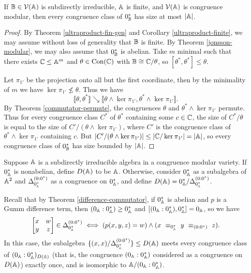 \begin{appendices}
\begin{prop}\label{monolith-bound} If $\mathbb{B} \in \mathcal{V}(\mathbb{A})$ is subdirectly irreducible, $\mathbb{A}$ is finite, and $\mathcal{V}(\mathbb{A})$ is congruence modular, then every congruence class of $0_{\mathbb{B}}^*$ has size at most $|\mathbb{A}|$.
\end{prop}
\begin{proof} By Theorem \ref{ultraproduct-fin-gen} and Corollary \ref{ultraproduct-finite}, we may assume without loss of generality that $\mathbb{B}$ is finite. By Theorem \ref{jonsson-modular}, we may also assume that $0_{\mathbb{B}}^*$ is abelian. Take $m$ minimal such that there exists $\mathbb{C} \le \mathbb{A}^m$ and $\theta \in \operatorname{Con}(\mathbb{C})$ with $\mathbb{B} \cong \mathbb{C}/\theta$, so $[\theta^*,\theta^*] \le \theta$.

Let $\pi_{1'}$ be the projection onto all but the first coordinate, then by the minimality of $m$ we have $\ker \pi_{1'} \not\le \theta$. Thus we have
\[
\llbracket \theta, \theta^* \rrbracket \searrow \llbracket \theta \wedge \ker \pi_{1'}, \theta^*\wedge \ker\pi_{1'} \rrbracket.
\]
By Theorem \ref{commutator-permute}, the congruences $\theta$ and $\theta^*\wedge \ker \pi_{1'}$ permute. Thus for every congruence class $C^*$ of $\theta^*$ containing some $c \in \mathbb{C}$, the size of $C^*/\theta$ is equal to the size of $C'/(\theta\wedge \ker\pi_{1'})$, where $C'$ is the congruence class of $\theta^*\wedge\ker\pi_{1'}$ containing $c$. But $|C'/(\theta\wedge \ker\pi_{1'})| \le |\mathbb{C}/\ker \pi_{1'}| = |\mathbb{A}|$, so every congruence class of $0_{\mathbb{B}}^*$ has size bounded by $|\mathbb{A}|$.
\end{proof}

\begin{defn} Suppose $\mathbb{A}$ is a subdirectly irreducible algebra in a congruence modular variety. If $0_{\mathbb{A}}^*$ is nonabelian, define $D(\mathbb{A})$ to be $\mathbb{A}$. Otherwise, consider $0_{\mathbb{A}}^*$ as a subalgebra of $\mathbb{A}^2$ and $\Delta_{0_{\mathbb{A}}^*}^{(0:0^*)}$ as a congruence on $0_{\mathbb{A}}^*$, and define $D(\mathbb{A}) = 0_{\mathbb{A}}^*/\Delta_{0_{\mathbb{A}}^*}^{(0:0^*)}$.
\end{defn}

Recall that by Theorem \ref{difference-commutator}, if $0_{\mathbb{A}}^*$ is abelian and $p$ is a Gumm difference term, then $(0_{\mathbb{A}}:0_{\mathbb{A}}^*) \ge 0_{\mathbb{A}}^*$ and $[(0_{\mathbb{A}}:0_{\mathbb{A}}^*),0_{\mathbb{A}}^*] = 0_{\mathbb{A}}$, so we have
\[
\begin{bmatrix} x & w\\ y & z\end{bmatrix} \in \Delta_{0_{\mathbb{A}}^*}^{(0:0^*)} \iff (p(x,y,z) = w) \wedge (x\ \equiv_{0_{\mathbb{A}}^*}\ y\ \equiv_{(0:0^*)}\ z).
\]
In this case, the subalgebra $\{(x,x)/\Delta_{0_{\mathbb{A}}^*}^{(0:0^*)}\} \le D(\mathbb{A})$ meets every congruence class of $(0_{\mathbb{A}}:0_{\mathbb{A}}^*)_{D(\mathbb{A})}$ (that is, the congruence $(0_{\mathbb{A}}:0_{\mathbb{A}}^*)$ considered as a congruence on $D(\mathbb{A})$) exactly once, and is isomorphic to $\mathbb{A}/(0_{\mathbb{A}}:0_{\mathbb{A}}^*)$.


\end{appendices}
